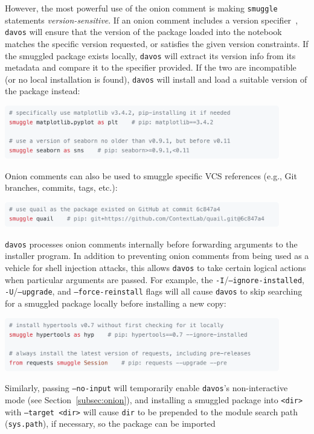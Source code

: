 \documentclass[preprint,12pt,a4paper]{elsarticle}
\begin{document}
However, the most powerful use of the onion comment is making \texttt{smuggle} statements \textit{version-sensitive}. If an onion comment includes a version specifier~\cite{CoghStuf13}, \texttt{davos} will ensure that the version of the package loaded into the notebook matches the specific version requested, or satisfies the given version constraints. If the smuggled package exists locally, \texttt{davos} will extract its version info from its metadata and compare it to the specifier provided. If the two are incompatible (or no local installation is found), \texttt{davos} will install and load a suitable version of the package instead:
\begin{center}
\includegraphics[width=0.9\textwidth]{figs/snippet3}
\end{center}
Onion comments can also be used to smuggle specific VCS references (e.g., Git~\cite{TorvHama05}  branches, commits, tags, etc.):
\begin{center}
\includegraphics[width=0.9\textwidth]{figs/snippet4}
\end{center}
\texttt{davos} processes onion comments internally before forwarding arguments to the installer program. In addition to preventing onion comments from being used as a vehicle for shell injection attacks, this allows \texttt{davos} to take certain logical actions when particular arguments are passed. For example, the \texttt{-I}/\newline\texttt{--ignore-installed}, \texttt{-U}/\texttt{--upgrade}, and \texttt{--force-reinstall} flags will all cause \texttt{davos} to skip searching for a smuggled package locally before installing a new copy:
\begin{center}
\includegraphics[width=0.9\textwidth]{figs/snippet5}
\end{center}
Similarly, passing \texttt{--no-input} will temporarily enable \texttt{davos}'s non-interactive mode (see Section~\ref{subsec:onion}), and installing a smuggled package into \texttt{<dir>} with \texttt{--target <dir>} will cause \texttt{dir} to be prepended to the module search path (\texttt{sys.path}), if necessary, so the package can be imported
\end{document}

